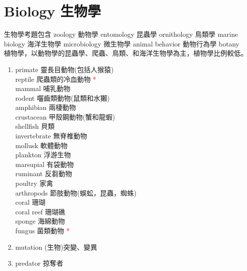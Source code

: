 \documentclass[twoside,b5paper]{book}
\begin{document}
  \chapter{Biology 生物學}
  生物學考題包含 zoology 動物學 entomology 昆蟲學 ornithology 鳥類學 marine biology 海洋生物學 microbiology 微生物學 animal
  behavior 動物行為學 botany 植物學，以動物學的昆蟲學、爬蟲、鳥類、和海洋生物學為主，植物學比例較低。

  \begin{enumerate}
    \item
      primate  靈長目動物(包括人猴猿)\\
      reptile  爬蟲類的冷血動物 \textcolor{red}{*}\\
      mammal  哺乳動物\\
      rodent  囓齒類動物(鼠類和水獺)\\
      amphibian  兩棲動物\\
      crustacean  甲殼鋼動物(蟹和龍蝦)\\
      shellfish 貝類\\
      invertebrate 無脊椎動物\\
      mollusk  軟體動物\\
      plankton  浮游生物\\
      marsupial  有袋動物\\
      ruminant  反芻動物\\
      poultry  家禽\\
      arthropods  節肢動物(蜈蚣，昆蟲，蜘蛛)\\
      coral 珊瑚\\
      coral reef 珊瑚礁\\
      sponge 海綿動物\\
      fungus  菌類動物 \textcolor{red}{*}
    \item
      mutation (生物)突變、變異\\
    \item
      predator  掠奪者\\

\end{enumerate}
\end{document}
